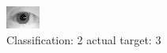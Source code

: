 \begin{figure}[h!]
\begin{center}
\includegraphics[width=0.60\columnwidth]{figures/ID1108_class_2_target_3.png}
\end{center}
\caption{ Classification: 2 actual target: 3}
\label{fig:ID1108_class_2_target_3}
\end{figure}
